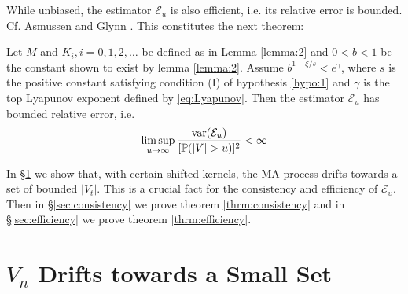 While unbiased, the estimator $\mathcal E_u$ is also efficient,
i.e. its relative error is bounded. Cf. Asmussen and Glynn
\cite{opac-b1123521}. This constitutes the next theorem:
\begin{theorem}
  \label{thrm:efficiency}
  Let $M$ and $K_i, i=0, 1, 2, \dots$ be defined as in Lemma
  \ref{lemma:2} and $0 < b <1$ be the constant shown to exist by lemma
  \ref{lemma:2}.
  Assume $b^{1- \xi/s} < e^\gamma$, where $s$ is the
  positive constant satisfying condition (I) of hypothesis
  \ref{hypo:1} and $\gamma$ is the top 
  Lyapunov exponent defined by \eqref{eq:Lyapunov}.
  Then the estimator $\mathcal E_u$ has bounded relative error, i.e.
  \begin{equation*}
    \limsup_{u \to \infty} {\text{var}(\mathcal E_u) \over [\mathbb{P}(|V| > u)]^2} < \infty
  \end{equation*}
\end{theorem}
In \S\ref{sec:drift} we show that, with certain shifted kernels, the
MA-process drifts towards a set of bounded $|V_t|$. This is a crucial
fact for the consistency and efficiency of $\mathcal E_u$.
Then in \S\ref{sec:consistency} we prove theorem
\ref{thrm:consistency} and in \S\ref{sec:efficiency} we prove theorem
\ref{thrm:efficiency}.

\section[The Chain Drifts towards a Small Set]{$V_n$ Drifts towards a Small Set}
\label{sec:drift}

